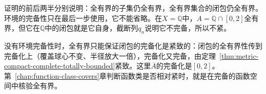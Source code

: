 证明的前后两半分别说明：全有界的子集仍全有界，全有界集合的闭包仍全有界。环境的完备性只在最后一步使用，它不能省略。在$X=\mathbb Q$中，$A=\mathbb Q\cap[0,2]$全有界，但它在$\mathbb Q$中的闭包就是它自身，截断列$q_n$说明它不完备，所以不紧。

没有环境完备性时，全有界只能保证闭包的完备化是紧致的：闭包的全有界性传到完备化上（覆盖球心不变、半径放大一倍），完备化又完备，由定理~\ref{thm:metric-compact-complete-totally-bounded}紧致。这里$\overline A$的完备化是$[0,2]$。第~\ref{chap:function-class-covers}章判断函数类是否相对紧时，就是在完备的函数空间中核验全有界。
